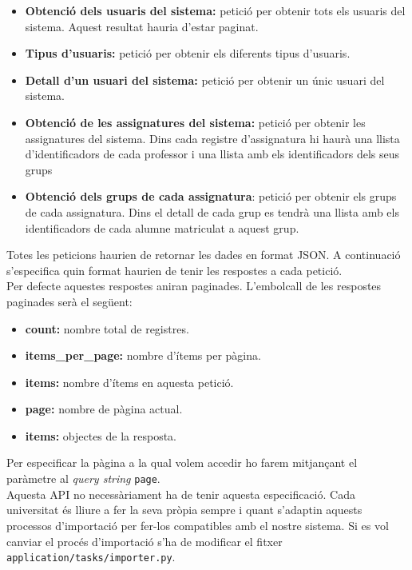 	\begin{itemize} 
		\item \textbf{Obtenció dels usuaris del sistema:} petició per obtenir tots els usuaris del sistema. Aquest resultat hauria d'estar paginat.
		\item \textbf{Tipus d'usuaris:} petició per obtenir els diferents tipus d'usuaris.
		\item \textbf{Detall d'un usuari del sistema:} petició per obtenir un únic usuari del sistema.
		\item \textbf{Obtenció de les assignatures del sistema:} petició per obtenir les assignatures del sistema. Dins cada registre d'assignatura hi haurà una llista d'identificadors de cada professor i una llista amb els identificadors dels seus grups
		
		\item \textbf{Obtenció dels grups de cada assignatura}: petició per obtenir els grups de cada assignatura. Dins el detall de cada grup es tendrà una llista amb els identificadors de cada alumne matriculat a aquest grup.
		
	\end{itemize}
	
Totes les peticions haurien de retornar les dades en format \ac{JSON}. A continuació s'especifica quin format haurien de tenir les respostes a cada petició.\\

Per defecte aquestes respostes aniran paginades. L'embolcall de les respostes paginades serà el següent:

\begin{itemize}
	\item \textbf{count:} nombre total de registres.
	\item \textbf{items\_per\_page:} nombre d'ítems per pàgina.
	\item \textbf{items:} nombre d'ítems en aquesta petició.
	\item \textbf{page:} nombre de pàgina actual.
	\item \textbf{items:} objectes de la resposta.
\end{itemize}

Per especificar la pàgina a la qual volem accedir ho farem mitjançant el paràmetre al \emph{query string} \texttt{page}.\\

Aquesta \ac{API} no necessàriament ha de tenir aquesta especificació. Cada universitat és lliure a fer la seva pròpia sempre i quant s'adaptin aquests processos d'importació per fer-los compatibles amb el nostre sistema. Si es vol canviar el procés d'importació s'ha de modificar el fitxer \texttt{application/tasks/importer.py}.\\

